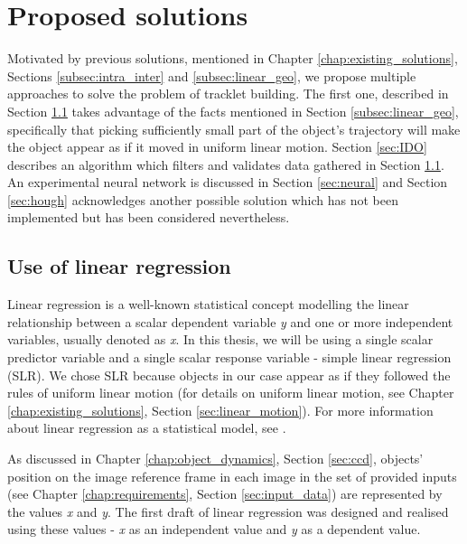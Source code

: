 \chapter{Proposed solutions}\label{chap:proposed_solutions}

	Motivated by previous solutions, mentioned in Chapter \ref{chap:existing_solutions}, Sections \ref{subsec:intra_inter} and \ref{subsec:linear_geo}, we propose multiple approaches to solve the problem of tracklet building. The first one, described in Section \ref{sec:linear_regression} takes advantage of the facts mentioned in Section \ref{subsec:linear_geo}, specifically that picking sufficiently small part of the object's trajectory will make the object appear as if it moved in uniform linear motion. Section \ref{sec:IDO} describes an algorithm which filters and validates data gathered in Section \ref{sec:linear_regression}. An experimental neural network is discussed in Section \ref{sec:neural} and Section \ref{sec:hough} acknowledges another possible solution which has not been implemented but has been considered nevertheless.

\section{Use of linear regression}\label{sec:linear_regression}

	Linear regression is a well-known statistical concept modelling the linear relationship between a scalar dependent variable \emph{y} and one or more independent variables, usually denoted as \emph{x}. In this thesis, we will be using a single scalar predictor variable and a single scalar response variable - simple linear regression (SLR). We chose SLR because objects in our case appear as if they followed the rules of uniform linear motion (for details on uniform linear motion, see Chapter \ref{chap:existing_solutions}, Section \ref{sec:linear_motion}). For more information about linear regression as a statistical model, see \citep{freedman2005statistical}.
	
	As discussed in Chapter \ref{chap:object_dynamics}, Section \ref{sec:ccd}, objects' position on the image reference frame in each image in the set of provided inputs (see Chapter \ref{chap:requirements}, Section \ref{sec:input_data}) are represented by the values \emph{x} and \emph{y}. The first draft of linear regression was designed and realised using these values - \emph{x} as an independent value and \emph{y} as a dependent value.
	
